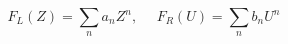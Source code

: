 \begin{equation}
F_{L}(Z)= \sum_{n} a_{n} Z^{n},~~~~~~F_{R}(U)=\sum_{n} b_{n} U^{n}
\end{equation}

